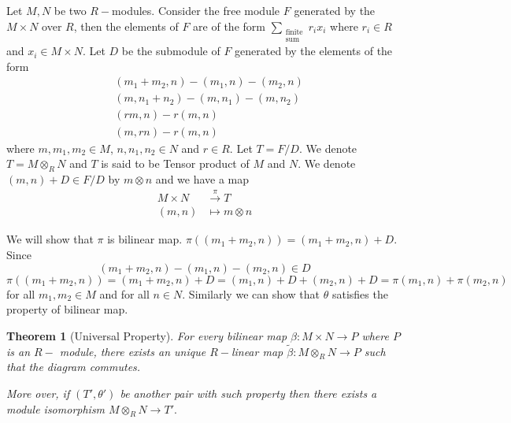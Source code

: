 \documentclass[11pt]{amsart}
\newtheorem{theorem}{Theorem}[section]
\begin{document}
Let $M, N$ be two $R-$modules. Consider the free module $F$ generated by the $M\times N$ over $R$, then the elements of $F$ are of the form $\displaystyle\sum_{\substack{\text{finite}\\\text{sum}}} r_ix_i$ where $r_i\in R$ and $x_i\in M\times N.$ Let $D$ be the submodule of $F$ generated by the elements of the form \begin{align*}
&(m_1+m_2,n)-(m_1,n)-(m_2,n)\\
&(m,n_1+n_2)-(m,n_1)-(m,n_2)\\
&(rm,n)-r(m,n)\\
&(m,rn)-r(m,n)
\end{align*}
where $m,m_1,m_2\in M$, $n,n_1,n_2\in N$ and $r\in R.$ Let $T=F/D.$ We denote $T=M\otimes_R N$ and $T$ is said to be Tensor product of $M$ and $N$. We denote $(m,n)+D\in F/D$ by $m\otimes n$ and we have a map \begin{align*}
M\times N&\stackrel{\pi}{\to} T\\
(m,n)&\mapsto m\otimes n
\end{align*}

We will show that $\pi$ is bilinear map. $\pi((m_1+m_2,n))=(m_1+m_2,n)+D.$ Since $$(m_1+m_2,n)-(m_1,n)-(m_2,n)\in D$$
$\pi((m_1+m_2,n))=(m_1+m_2,n)+D=(m_1,n)+D+(m_2,n)+D=\pi(m_1,n)+\pi(m_2,n)$ for all $m_1,m_2\in M$ and for all $n\in N$. Similarly we can show that $\theta$ satisfies the property of bilinear map.

\begin{theorem}[Universal Property]

For every bilinear map $\beta:M\times N\to P$ where $P$ is an $R-$ module, there exists an unique $R-$linear map $\tilde{\beta}:M\otimes_R N\to P$ such that the diagram commutes.

\begin{center}


\end{center}


 More over, if $(T',\theta')$ be another pair with such property then there exists a module isomorphism $M\otimes_RN\to T'.$

\end{theorem}
\end{document}
